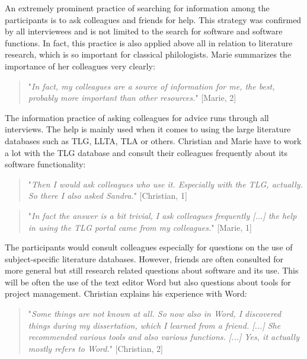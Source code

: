 \documentclass[12pt, a4paper, titlepage, oneside, abstract=true, toc=listof, toc=bibliography]{scrreprt}
\begin{document}
{%
An extremely prominent practice of searching for information among the participants is to ask colleagues and friends for help. This strategy was confirmed by all interviewees and is not limited to the search for software and software functions. In fact, this practice is also applied above all in relation to literature research, which is so important for classical philologists. Marie summarizes the importance of her colleagues very clearly: 

\begin{quotation}
"\textit{In fact, my colleagues are a source of information for me, the best, probably more important than other resources.}" [Marie, 2]
\end{quotation}

The information practice of asking colleagues for advice runs through all interviews. The help is mainly used when it comes to using the large literature databases such as TLG, LLTA, TLA or others. Christian and Marie have to work a lot with the TLG database and consult their colleagues frequently about its software functionality: 

\begin{quotation}
"\textit{Then I would ask colleagues who use it. Especially with the TLG, actually. So there I also asked Sandra.}" [Christian, 1]
\end{quotation}

\begin{quotation}
"\textit{In fact the answer is a bit trivial, I ask colleagues frequently [...]  the help in using the TLG portal came from my colleagues.}" [Marie, 1]
\end{quotation}

The participants would consult colleagues especially for questions on the use of subject-specific literature databases. 
However, friends are often consulted for more general but still research related questions about software and its use. This will be often the use of the text editor Word but also questions about tools for project management. Christian explains his experience with Word:

\begin{quotation}
"\textit{Some things are not known at all. So now also in Word, I discovered things during my dissertation, which I learned from a friend. [...] She recommended various tools and also various functions. [...] Yes, it actually mostly refers to Word.}" [Christian, 2]
\end{quotation}

}
\end{document}
